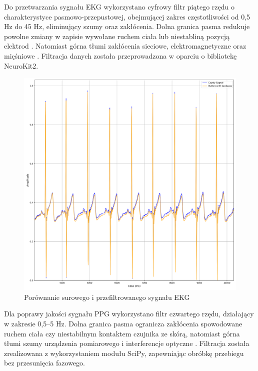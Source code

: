 \documentclass[journal]{IEEEtran}
\begin{document}
Do przetwarzania sygnału EKG wykorzystano cyfrowy filtr piątego rzędu o charakterystyce pasmowo-przepustowej, obejmującej zakres częstotliwości od 0,5 Hz do 45 Hz, eliminujący szumy oraz zakłócenia. Dolna granica pasma redukuje powolne zmiany w zapisie wywołane ruchem ciała lub niestabliną pozycją elektrod  \cite{18}. Natomiast górna tłumi zakłócenia sieciowe, elektromagnetyczne oraz mięśniowe  \cite{19}. Filtracja danych została przeprowadzona w oparciu o bibliotekę NeuroKit2.

\begin{figure}[htbp]
    \centering
    \includegraphics[width=0.76\linewidth]{Filtr_EKG.png} 
    \caption{Porównanie surowego i przefiltrowanego sygnału EKG}
    \label{fig:filtr_ekg}
\end{figure}

\newpage
Dla poprawy jakości sygnału PPG wykorzystano filtr  czwartego rzędu, działający w zakresie 0,5–5 Hz. Dolna granica pasma ogranicza zakłócenia spowodowane ruchem ciała czy niestabilnym kontaktem czujnika ze skórą, natomiast górna tłumi szumy urządzenia pomiarowego i interferencje optyczne  \cite{20}. Filtracja została zrealizowana z wykorzystaniem  modułu SciPy, zapewniając obróbkę przebiegu bez przesunięcia fazowego.
\end{document}
